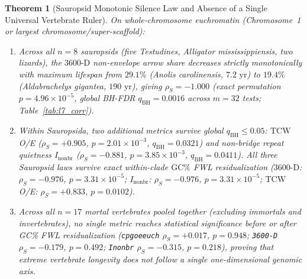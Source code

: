 \documentclass[11pt,a4paper]{article}
\renewcommand{\_}{\origunderscore\penalty200\relax}
\newtheorem{theorem}{Theorem}[section]
\theoremstyle{remark}
\begin{document}
\begin{theorem}[Sauropsid Monotonic Silence Law and Absence of a Single Universal Vertebrate Ruler]
\label{thm:L7}
On whole-chromosome euchromatin (Chromosome~1 or largest chromosome/super-scaffold):
\begin{enumerate}
  \item Across all $n=8$ sauropsids (five Testudines, \textit{Alligator mississippiensis}, two lizards), the $3600\text{-D}$ non-envelope arrow share decreases strictly monotonically with maximum lifespan from $29.1\%$ (\textit{Anolis carolinensis}, $7.2\text{ yr}$) to $19.4\%$ (\textit{Aldabrachelys gigantea}, $190\text{ yr}$), giving $\rho_S = -1.000$ (exact permutation $p = 4.96 \times 10^{-5}$, global BH-FDR $q_{\mathrm{BH}} = 0.0016$ across $m=32$ tests; Table~\ref{tab:l7_corr}).
  \item Within Sauropsida, two additional metrics survive global $q_{\mathrm{BH}} \le 0.05$: $\mathrm{TCW}$ O/E ($\rho_S = +0.905$, $p = 2.01\times 10^{-3}$, $q_{\mathrm{BH}} = 0.0321$) and non-bridge repeat quietness $I_{\mathrm{nonbr}}$ ($\rho_S = -0.881$, $p = 3.85\times 10^{-3}$, $q_{\mathrm{BH}} = 0.0411$). All three Sauropsid laws survive exact within-clade $\mathrm{GC}\%$ FWL residualization ($\mathrm{3600\text{-}D}$: $\rho_S = -0.976$, $p = 3.31\times 10^{-5}$; $I_{\mathrm{nonbr}}$: $\rho_S = -0.976$, $p = 3.31\times 10^{-5}$; $\mathrm{TCW}$ O/E: $\rho_S = +0.833$, $p = 0.0102$).
  \item Across all $n=17$ mortal vertebrates pooled together (excluding immortals and invertebrates), no single metric reaches statistical significance before or after GC\% FWL residualization (\texttt{cpg\_oe\_euch} $\rho_S = +0.017$, $p = 0.948$; \texttt{3600-D} $\rho_S = -0.179$, $p = 0.492$; \texttt{I\_nonbr} $\rho_S = -0.315$, $p = 0.218$), proving that extreme vertebrate longevity does not follow a single one-dimensional genomic axis.
\end{enumerate}
\end{theorem}
\end{document}
